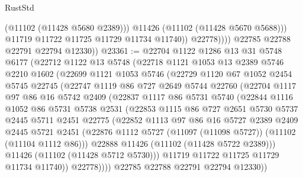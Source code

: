 \begin{lexlean}{RustStd}
\begin{coremodule}
                        (@11102 (@11428 @5680 @2389)))
                      @11426
                      (@11102 (@11428 @5670 @5688)))
                    @11719
                    @11722
                    @11725
                    @11729
                    @11734
                    @11740))
                @22778))))
        @22785
        @22788
        @22791
        @22794
        @12330))
@23361 := @22704
    @1122
    @1286
    @13
    @31
    @5748
    @6177
    (@22712
      @1122
      @13
      @5748
      (@22718
        @1121
        @1053
        @13
        @2389
        @5746
        @2210
        @1602
        (@22699
          @1121
          @1053
          @5746
          (@22729
            @1120
            @67
            @1052
            @2454
            @5745
            @22745
            (@22747
              @1119
              @86
              @727
              @2649
              @5744
              @22760
              (@22704
                @1117
                @97
                @86
                @16
                @5742
                @2409
                (@22837
                  @1117
                  @86
                  @5731
                  @5740
                  (@22844
                    @1116
                    @1052
                    @86
                    @5731
                    @5738
                    @2531
                    (@22853
                      @1115
                      @86
                      @727
                      @2651
                      @5730
                      @5737
                      @2445
                      @5711
                      @2451
                      @22775
                      (@22852
                        @1113
                        @97
                        @86
                        @16
                        @5727
                        @2389
                        @2409
                        @2445
                        @5721
                        @2451
                        (@22876 @1112 @5727 (@11097 (@11098 @5727)) (@11102 (@11104 @1112 @86)))
                        @22888
                        @11426
                        (@11102 (@11428 @5722 @2389)))
                      @11426
                      (@11102 (@11428 @5712 @5730)))
                    @11719
                    @11722
                    @11725
                    @11729
                    @11734
                    @11740))
                @22778))))
        @22785
        @22788
        @22791
        @22794
        @12330))

\end{coremodule}
\end{lexlean}
